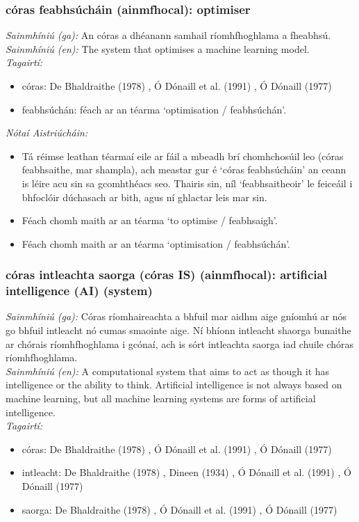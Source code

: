 \documentclass{article}
\begin{document}
\subsubsection*{córas feabhsúcháin (ainmfhocal): optimiser}
 \noindent \textit{Sainmhíniú (ga):} An córas a dhéanann samhail ríomhfhoghlama a fheabhsú.
\\
 \noindent \textit{Sainmhíniú (en):} The system that optimises a machine learning model.
\\
 \noindent \textit{Tagairtí:}
\begin{itemize}
	\item córas: De Bhaldraithe (1978) \cite{de-bhaldraithe}, Ó Dónaill et al. (1991) \cite{focloir-beag}, Ó Dónaill (1977) \cite{odonaill}
	\item feabhsúchán: féach ar an téarma `optimisation / feabhsúchán'.
\end{itemize}

 \noindent \textit{Nótaí Aistriúcháin:}
\begin{itemize}
	\item Tá réimse leathan téarmaí eile ar fáil a mbeadh brí chomhchosúil leo (córas feabhsaithe, mar shampla), ach meastar gur é `córas feabhsúcháin' an ceann is léire acu sin sa gcomhthéacs seo. Thairis sin, níl `feabhsaitheoir' le feiceáil i bhfoclóir dúchasach ar bith, agus ní ghlactar leis mar sin.
	\item Féach chomh maith ar an téarma `to optimise / feabhsaigh'.
	\item Féach chomh maith ar an téarma `optimisation / feabhsúchán'.
\end{itemize}


\subsubsection*{córas intleachta saorga (córas IS) (ainmfhocal): artificial intelligence (AI) (system)}
 \noindent \textit{Sainmhíniú (ga):} Córas ríomhaireachta a bhfuil mar aidhm aige gníomhú ar nós go bhfuil intleacht nó cumas smaointe aige. Ní bhíonn intleacht shaorga bunaithe ar chórais ríomhfhoghlama i gcónaí, ach is sórt intleachta saorga iad chuile chóras ríomhfhoghlama.
\\
 \noindent \textit{Sainmhíniú (en):} A computational system that aims to act as though it has intelligence or the ability to think. Artificial intelligence is not always based on machine learning, but all machine learning systems are forms of artificial intelligence.
\\
 \noindent \textit{Tagairtí:}
\begin{itemize}
	\item córas: De Bhaldraithe (1978) \cite{de-bhaldraithe}, Ó Dónaill et al. (1991) \cite{focloir-beag}, Ó Dónaill (1977) \cite{odonaill}
	\item intleacht: De Bhaldraithe (1978) \cite{de-bhaldraithe}, Dineen (1934) \cite{dineen}, Ó Dónaill et al. (1991) \cite{focloir-beag}, Ó Dónaill (1977) \cite{odonaill}
	\item saorga: De Bhaldraithe (1978) \cite{de-bhaldraithe}, Ó Dónaill et al. (1991) \cite{focloir-beag}, Ó Dónaill (1977) \cite{odonaill}
\end{itemize}
\end{document}
